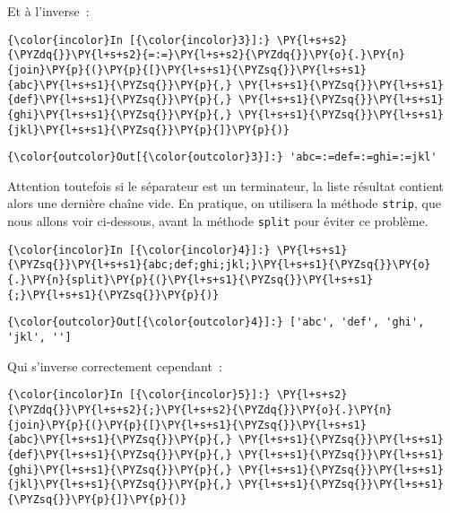    Et à l'inverse~:

    \begin{Verbatim}[commandchars=\\\{\}]
{\color{incolor}In [{\color{incolor}3}]:} \PY{l+s+s2}{\PYZdq{}}\PY{l+s+s2}{=:=}\PY{l+s+s2}{\PYZdq{}}\PY{o}{.}\PY{n}{join}\PY{p}{(}\PY{p}{[}\PY{l+s+s1}{\PYZsq{}}\PY{l+s+s1}{abc}\PY{l+s+s1}{\PYZsq{}}\PY{p}{,} \PY{l+s+s1}{\PYZsq{}}\PY{l+s+s1}{def}\PY{l+s+s1}{\PYZsq{}}\PY{p}{,} \PY{l+s+s1}{\PYZsq{}}\PY{l+s+s1}{ghi}\PY{l+s+s1}{\PYZsq{}}\PY{p}{,} \PY{l+s+s1}{\PYZsq{}}\PY{l+s+s1}{jkl}\PY{l+s+s1}{\PYZsq{}}\PY{p}{]}\PY{p}{)}
\end{Verbatim}


\begin{Verbatim}[commandchars=\\\{\}]
{\color{outcolor}Out[{\color{outcolor}3}]:} 'abc=:=def=:=ghi=:=jkl'
\end{Verbatim}
            
    Attention toutefois si le séparateur est un terminateur, la liste
résultat contient alors une dernière chaîne vide. En pratique, on
utilisera la méthode \texttt{strip}, que nous allons voir ci-dessous,
avant la méthode \texttt{split} pour éviter ce problème.

    \begin{Verbatim}[commandchars=\\\{\}]
{\color{incolor}In [{\color{incolor}4}]:} \PY{l+s+s1}{\PYZsq{}}\PY{l+s+s1}{abc;def;ghi;jkl;}\PY{l+s+s1}{\PYZsq{}}\PY{o}{.}\PY{n}{split}\PY{p}{(}\PY{l+s+s1}{\PYZsq{}}\PY{l+s+s1}{;}\PY{l+s+s1}{\PYZsq{}}\PY{p}{)}
\end{Verbatim}


\begin{Verbatim}[commandchars=\\\{\}]
{\color{outcolor}Out[{\color{outcolor}4}]:} ['abc', 'def', 'ghi', 'jkl', '']
\end{Verbatim}
            
    Qui s'inverse correctement cependant~:

    \begin{Verbatim}[commandchars=\\\{\}]
{\color{incolor}In [{\color{incolor}5}]:} \PY{l+s+s2}{\PYZdq{}}\PY{l+s+s2}{;}\PY{l+s+s2}{\PYZdq{}}\PY{o}{.}\PY{n}{join}\PY{p}{(}\PY{p}{[}\PY{l+s+s1}{\PYZsq{}}\PY{l+s+s1}{abc}\PY{l+s+s1}{\PYZsq{}}\PY{p}{,} \PY{l+s+s1}{\PYZsq{}}\PY{l+s+s1}{def}\PY{l+s+s1}{\PYZsq{}}\PY{p}{,} \PY{l+s+s1}{\PYZsq{}}\PY{l+s+s1}{ghi}\PY{l+s+s1}{\PYZsq{}}\PY{p}{,} \PY{l+s+s1}{\PYZsq{}}\PY{l+s+s1}{jkl}\PY{l+s+s1}{\PYZsq{}}\PY{p}{,} \PY{l+s+s1}{\PYZsq{}}\PY{l+s+s1}{\PYZsq{}}\PY{p}{]}\PY{p}{)}
\end{Verbatim}


